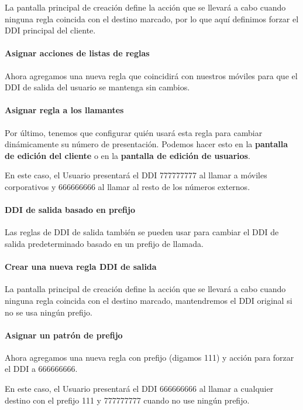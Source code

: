 \documentclass[letterpaper,10pt,spanish]{sphinxmanual}
\begin{document}
La pantalla principal de creación define la acción que se llevará a cabo cuando ninguna regla coincida con el destino marcado, por lo que aquí definimos forzar el DDI principal del cliente.
\paragraph{Asignar acciones de listas de reglas}

Ahora agregamos una nueva regla que coincidirá con nuestros móviles para que el DDI de salida del usuario se mantenga sin cambios.
\paragraph{Asignar regla a los llamantes}

Por último, tenemos que configurar quién usará esta regla para cambiar dinámicamente su número de presentación. Podemos hacer esto en la \textbf{pantalla de edición del cliente} o en la \textbf{pantalla de edición de usuarios}.

En este caso, el Usuario presentará el DDI 777777777 al llamar a móviles corporativos y 666666666 al llamar al resto de los números externos.


\paragraph{DDI de salida basado en prefijo}
\label{administration_portal/client/vpbx/user_configuration/outgoing_ddi_rules:outgoing-ddi-based-on-prefix}
Las reglas de DDI de salida también se pueden usar para cambiar el DDI de salida predeterminado basado en un prefijo de llamada.
\paragraph{Crear una nueva regla DDI de salida}

La pantalla principal de creación define la acción que se llevará a cabo cuando ninguna regla coincida con el destino marcado, mantendremos el DDI original si no se usa ningún prefijo.
\paragraph{Asignar un patrón de prefijo}

Ahora agregamos una nueva regla con prefijo (digamos 111) y acción para forzar el DDI a 666666666.

En este caso, el Usuario presentará el DDI 666666666 al llamar a cualquier destino con el prefijo 111 y 777777777 cuando no use ningún prefijo.
\end{document}
